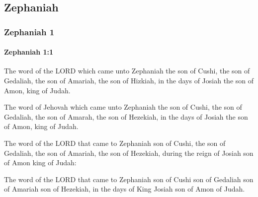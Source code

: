 \subsection{Zephaniah}
	\label{ZEPHANIAH}

	\subsubsection{Zephaniah 1} %
		\label{ZEPHANIAH-1}

		\paragraph{Zephaniah 1:1} %
			\label{ZEPHANIAH-1-1}

			The word of the LORD which came unto Zephaniah the son of Cushi, the son of Gedaliah, the son of Amariah, the son of Hizkiah, in the days of Josiah the son of Amon, king of Judah.

			\begin{versebox}
					\item[BHS] 
					\item[LXX] 
					\item[ASV] The word of Jehovah which came unto Zephaniah the son of Cushi, the son of Gedaliah, the son of Amarah, the son of Hezekiah, in the days of Josiah the son of Amon, king of Judah.
					\item[NIV] The word of the LORD that came to Zephaniah son of Cushi, the son of Gedaliah, the son of Amariah, the son of Hezekiah, during the reign of Josiah son of Amon king of Judah:
					\item[NRSV] The word of the LORD that came to Zephaniah son of Cushi son of Gedaliah son of Amariah son of Hezekiah, in the days of King Josiah son of Amon of Judah.
			\end{versebox}

